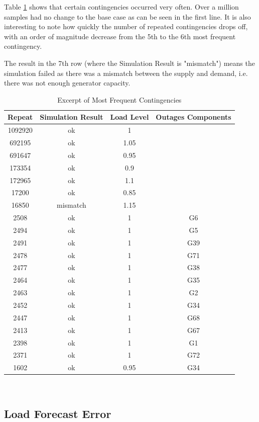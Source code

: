 \documentclass[a4paper,oneside,12pt]{report}
\begin{document}
Table \ref{table_common_contingencies} shows that certain contingencies occurred very often. Over a million samples had no change to the base case as can be seen in the first line. It is also interesting to note how quickly the number of repeated contingencies drops off, with an order of magnitude decrease from the 5th to the 6th most frequent contingency.

The result in the 7th row (where the Simulation Result is "mismatch") means the simulation failed as there was a mismatch between the supply and demand, i.e. there was not enough generator capacity.

\begin{table}[htbp]
\caption{Excerpt of Most Frequent Contingencies}
\label{table_common_contingencies}
\centering
\begin{tabular}{c||c||c||c}
\bfseries Repeat & \bfseries Simulation Result & \bfseries Load Level & \bfseries Outages Components \\
\hline \hline
1092920 & ok & 1 & \\ 
692195 & ok & 1.05 & \\ 
691647 & ok & 0.95 & \\ 
173354 & ok & 0.9 & \\ 
172965 & ok & 1.1 & \\ 
17200 & ok & 0.85 & \\ 
16850 & mismatch & 1.15 & \\ 
2508 & ok & 1 & G6 \\ 
2494 & ok & 1 & G5 \\ 
2491 & ok & 1 & G39 \\ 
2478 & ok & 1 & G71 \\ 
2477 & ok & 1 & G38 \\ 
2464 & ok & 1 & G35 \\ 
2463 & ok & 1 & G2 \\ 
2452 & ok & 1 & G34 \\ 
2447 & ok & 1 & G68 \\ 
2413 & ok & 1 & G67 \\ 
2398 & ok & 1 & G1 \\ 
2371 & ok & 1 & G72 \\ 
1602 & ok & 0.95 & G34 \\ 
\hline
\end{tabular}\\
\end{table}

\subsection{Load Forecast Error}
\end{document}
